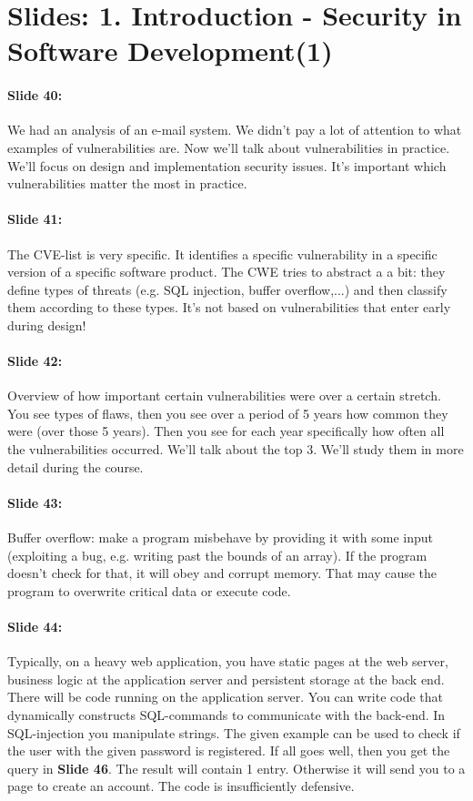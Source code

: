 \documentclass[10pt,a4paper]{report}
\begin{document}
\section{Slides: 1. Introduction - Security in Software Development(1)}

\paragraph{Slide 40:} We had an analysis of an e-mail system. We didn't pay a lot of attention to what examples of vulnerabilities are. Now we'll talk about vulnerabilities in practice. We'll focus on design and implementation security issues. It's important which vulnerabilities matter the most in practice. 

\paragraph{Slide 41:} The CVE-list is very specific. It identifies a specific vulnerability in a specific version of a specific software product. The CWE tries to abstract a a bit: they define types of threats (e.g. SQL injection, buffer overflow,...) and then classify them according to these types.
It's not based on vulnerabilities that enter early during design! 

\paragraph{Slide 42:} Overview of how important certain vulnerabilities were over a certain stretch. You see types of flaws, then you see over a period of 5 years how common they were (over those 5 years). Then you see for each year specifically how often all the vulnerabilities occurred. 
We'll talk about the top 3. We'll study them in more detail during the course.

\paragraph{Slide 43:} Buffer overflow: make a program misbehave by providing it with some input (exploiting a bug, e.g. writing past the bounds of an array). If the program doesn't check for that, it will obey and corrupt memory. That may cause the program to overwrite critical data or execute code.

\paragraph{Slide 44:} Typically, on a heavy web application, you have static pages at the web server, business logic at the application server and persistent storage at the back end. There will be code running on the application server. You can write code that dynamically constructs SQL-commands to communicate with the back-end. In SQL-injection you manipulate strings. The given example can be used to check if the user with the given password is registered. If all goes well, then you get the query in \textbf{Slide 46}. The result will contain 1 entry. Otherwise it will send you to a page to create an account. The code is insufficiently defensive.
\end{document}
